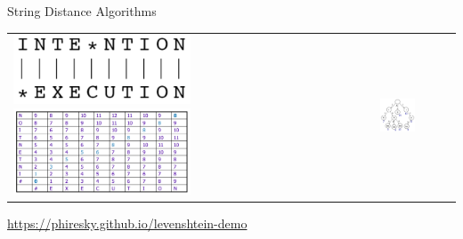 \documentclass[10pt]{beamer}
\begin{document}
\begin{frame}{String Distance Algorithms}

\begin{tabular}{p{5cm} p{7cm}}
    \vspace{0pt}
    \includegraphics[width=0.5\textwidth]{figures/string-alignment.png}
	  \vspace{0pt}
    \includegraphics[width=0.5\textwidth]{figures/edit-distance-table.png}
    &
    \vspace{0pt}
    \includegraphics[width=0.5\textwidth]{figures/trie-example.png}
\end{tabular}

\begin{center}
  \textcolor{blue}{\url{https://phiresky.github.io/levenshtein-demo}}
\end{center}

\end{frame}
\end{document}
